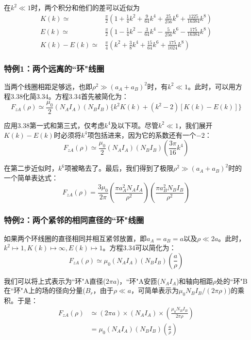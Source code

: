 在$k^2\ll 1$时，两个积分和他们的差可以近似为
\begin{subequations}
	\begin{align}
  K(k) \simeq&  \frac{\pi}{2}(1+\frac{1}{4}k^2+\frac{9}{64}k^4+\frac{25}{256}k^6+\frac{1225}{16384}k^8)\\
  E(k) \simeq&  \frac{\pi}{2}(1-\frac{1}{4}k^2-\frac{3}{64}k^4-\frac{5}{256}k^6-\frac{175}{16384}k^8)\\ 
  K(k)-E(k) \simeq& \frac{\pi}{4}(k^2+\frac{3}{8}k^4+\frac{15}{64}k^6+\frac{175}{1024}k^8) 
  	\end{align}
\end{subequations}

\subsubsection{特例1：两个远离的``环"线圈}
当两个线圈相距足够远，也即$\rho^2 \gg (a_A+a_B)^2$时，有$k^2\ll 1$。此时，可以用方程3.38化简3.34。方程3.34首先被简化为：
\begin{equation}
  F_{zA}(\rho)\simeq \frac{\mu_0}{2}(N_A I_A)(N_B I_B)\{ k^2K(k)+(k^2-2)[K(k)-E(k)]\}
\end{equation}

应用3.38第一式和第三式，仅考虑$k^4$及以下项。尽管$k^2\ll 1$，我们展开$K(k)-E(k)$时必须将$k^4$项包括进来，因为它的系数还有一个$-2$：
\begin{equation*}
F_{zA}(\rho)\simeq \frac{\mu_0}{2}(N_A I_A)(N_B I_B)(\frac{3\pi}{16}k^4) \tag{3.39'}
\end{equation*}

在第二步近似时，$k^6$项被略去了。最后，我们得到了极限$\rho^2 \gg (a_A+a_B)^2$时的一个简单表达式：
\begin{equation*}
F_{zA}(\rho)= \frac{3\mu_0}{2\pi}(\frac{\pi a_A^2 N_A I_A}{\rho^2})(\frac{\pi a_B^2 N_B I_B}{\rho^2}) \tag{3.39''}
\end{equation*}

\subsubsection{特例2：两个紧邻的相同直径的``环"线圈}
如果两个环线圈的直径相同并相互紧邻放置，即$a_A=a_B=a$以及$\rho\ll 2a$。此时，$k^2\mapsto 1,K(k)\mapsto\infty,E(k)\mapsto 1$。方程3.34可以简化为：
\begin{equation*}
F_{zA}(\rho)\simeq \mu_0(N_A I_A)(N_B I_B)(\frac{a}{\rho}) \tag{3.39'''}
\end{equation*}

我们可以将上式表示为``环"A直径($2\pi a$)，``环"A安匝($N_A I_A$)和轴向相距$\rho$处的``环"B在``环"A上的场的径向分量($B_r$，由于$\rho\ll a$，可简单表示为$\mu_0 N_B I_B/(2\pi\rho)$)的乘积。于是：
\begin{equation*}
\begin{split}
F_{zA}(\rho)&\simeq (2\pi a)\times(N_A I_A)\times(\frac{\mu_0 N_B I_B}{2\pi\rho})\\
&=\mu_0(N_A I_A)(N_B I_B)(\frac{a}{\rho}) 
\end{split}\tag{3.39'''}
\end{equation*}


